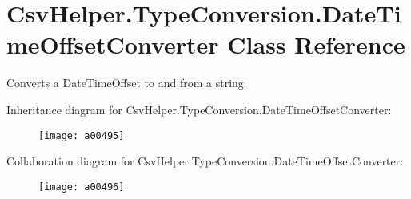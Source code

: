 \hypertarget{a00081}{\section{Csv\-Helper.\-Type\-Conversion.\-Date\-Time\-Offset\-Converter Class Reference}
\label{a00081}
}


Converts a Date\-Time\-Offset to and from a string.  




Inheritance diagram for Csv\-Helper.\-Type\-Conversion.\-Date\-Time\-Offset\-Converter\-:
\nopagebreak
\begin{figure}[H]
\begin{center}
\leavevmode
\texttt{[image: a00495]}
\end{center}
\end{figure}


Collaboration diagram for Csv\-Helper.\-Type\-Conversion.\-Date\-Time\-Offset\-Converter\-:
\nopagebreak
\begin{figure}[H]
\begin{center}
\leavevmode
\texttt{[image: a00496]}
\end{center}
\end{figure}

